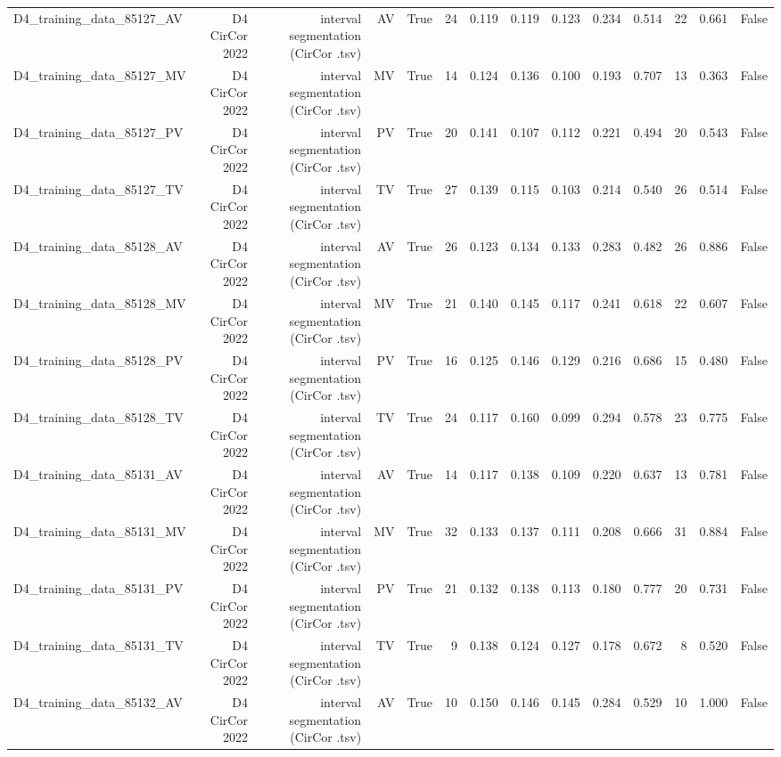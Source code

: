 \begin{table}[htbp]
\begin{tabular}{lrrrrrrrrrrrrr}
    D4\_training\_data\_85127\_AV & D4 CirCor 2022 & interval segmentation (CirCor .tsv) & AV & True & 24 & 0.119 & 0.119 & 0.123 & 0.234 & 0.514 & 22 & 0.661 & False \\
    D4\_training\_data\_85127\_MV & D4 CirCor 2022 & interval segmentation (CirCor .tsv) & MV & True & 14 & 0.124 & 0.136 & 0.100 & 0.193 & 0.707 & 13 & 0.363 & False \\
    D4\_training\_data\_85127\_PV & D4 CirCor 2022 & interval segmentation (CirCor .tsv) & PV & True & 20 & 0.141 & 0.107 & 0.112 & 0.221 & 0.494 & 20 & 0.543 & False \\
    D4\_training\_data\_85127\_TV & D4 CirCor 2022 & interval segmentation (CirCor .tsv) & TV & True & 27 & 0.139 & 0.115 & 0.103 & 0.214 & 0.540 & 26 & 0.514 & False \\
    D4\_training\_data\_85128\_AV & D4 CirCor 2022 & interval segmentation (CirCor .tsv) & AV & True & 26 & 0.123 & 0.134 & 0.133 & 0.283 & 0.482 & 26 & 0.886 & False \\
    D4\_training\_data\_85128\_MV & D4 CirCor 2022 & interval segmentation (CirCor .tsv) & MV & True & 21 & 0.140 & 0.145 & 0.117 & 0.241 & 0.618 & 22 & 0.607 & False \\
    D4\_training\_data\_85128\_PV & D4 CirCor 2022 & interval segmentation (CirCor .tsv) & PV & True & 16 & 0.125 & 0.146 & 0.129 & 0.216 & 0.686 & 15 & 0.480 & False \\
    D4\_training\_data\_85128\_TV & D4 CirCor 2022 & interval segmentation (CirCor .tsv) & TV & True & 24 & 0.117 & 0.160 & 0.099 & 0.294 & 0.578 & 23 & 0.775 & False \\
    D4\_training\_data\_85131\_AV & D4 CirCor 2022 & interval segmentation (CirCor .tsv) & AV & True & 14 & 0.117 & 0.138 & 0.109 & 0.220 & 0.637 & 13 & 0.781 & False \\
    D4\_training\_data\_85131\_MV & D4 CirCor 2022 & interval segmentation (CirCor .tsv) & MV & True & 32 & 0.133 & 0.137 & 0.111 & 0.208 & 0.666 & 31 & 0.884 & False \\
    D4\_training\_data\_85131\_PV & D4 CirCor 2022 & interval segmentation (CirCor .tsv) & PV & True & 21 & 0.132 & 0.138 & 0.113 & 0.180 & 0.777 & 20 & 0.731 & False \\
    D4\_training\_data\_85131\_TV & D4 CirCor 2022 & interval segmentation (CirCor .tsv) & TV & True & 9 & 0.138 & 0.124 & 0.127 & 0.178 & 0.672 & 8 & 0.520 & False \\
    D4\_training\_data\_85132\_AV & D4 CirCor 2022 & interval segmentation (CirCor .tsv) & AV & True & 10 & 0.150 & 0.146 & 0.145 & 0.284 & 0.529 & 10 & 1.000 & False \\

\end{tabular}
\end{table}
